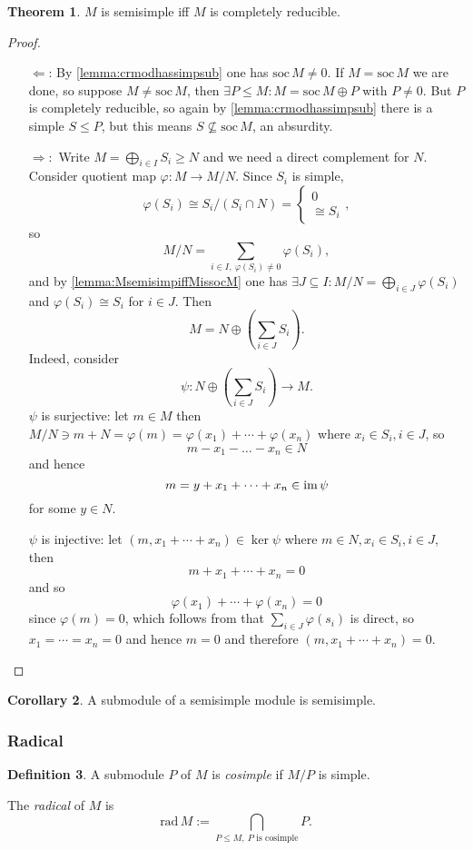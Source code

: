 \documentclass[a4paper]{article}
\newcommand{\rad}{\text{rad}\,}
\newcommand{\soc}{\text{soc}\,}
\newcommand{\im}{\text{im\,}}
\theoremstyle{definition}
\newtheorem{defn}{Definition}[subsection]
\newtheorem{thm}[defn]{Theorem}
\newtheorem{coro}[defn]{Corollary}
\begin{document}
\begin{thm}
\label{thm:semisimpequivcompred}
$M$ is semisimple iff $M$ is completely reducible.
\end{thm}
\begin{proof}
\begin{enumerate}
\item[$\Leftarrow$:] By \ref{lemma:crmodhassimpsub} one has $\soc M\neq 0$. If $M=\soc M$ we are done, so suppose $M\neq\soc M$, then $\exists P\leq M:M=\soc M\oplus P$ with $P\neq 0$. But $P$ is completely reducible, so again by \ref{lemma:crmodhassimpsub} there is a simple $S\leq P$, but this means $S\not\subseteq\soc M$, an absurdity.
\item[$\Rightarrow:$] Write $M=\bigoplus_{i\in I}S_i\geq N$ and we need a direct complement for $N$. Consider quotient map $\varphi:M\rightarrow M/N$. Since $S_i$ is simple,
\[
\varphi(S_i)\cong S_i/(S_i\cap N)=\left\{\begin{aligned}
  0\\\cong S_i
\end{aligned} \right.,
\]
so
\[
M/N=\sum_{i\in I,\ \varphi(S_i)\neq 0}\varphi(S_i),
\]
and by \ref{lemma:MsemisimpiffMissocM} one has $\exists J\subseteq I:M/N=\bigoplus_{i\in J}\varphi(S_i)$ and $\varphi(S_i)\cong S_i$ for $i\in J$. Then
\[
M=N\oplus \left(\sum_{i\in J}S_i\right).
\]
Indeed, consider
\[
\psi:N\oplus \left(\sum_{i\in J}S_i\right)\rightarrow M.
\]
$\psi$ is surjective: let $m\in M$ then $M/N\ni m+N=\varphi(m)=\varphi(x_1)+\cdots+\varphi(x_n)$ where $x_i\in S_i,i\in J$, so
\[
m-x_1-\ldots-x_n\in N
\]
and hence
\[
m=y+x_1+\cdots+x_n\in\im\psi
\]
for some $y\in N$.

$\psi$ is injective: let $(m,x_1+\cdots+x_n)\in\ker\psi$ where $m\in N,x_i\in S_i,i\in J$, then
\[
m+x_1+\cdots+x_n=0
\]
and so
\[
\varphi(x_1)+\cdots+\varphi(x_n)=0
\]
since $\varphi(m)=0$, which follows from that $\sum_{i\in J}\varphi(s_i)$ is direct, so $x_1=\cdots=x_n=0$ and hence $m=0$ and therefore $(m,x_1+\cdots+x_n)=0$.
\end{enumerate}
\end{proof}

\begin{coro}
\label{coro:subofsemisimpissemisimp}
A submodule of a semisimple module is semisimple.
\end{coro}

\subsubsection{Radical}
\begin{defn}
A submodule $P$ of $M$ is \textit{cosimple} if $M/P$ is simple.

The \textit{radical} of $M$ is
\[
\rad M:=\bigcap_{P\leq M,\ P\text{ is cosimple}} P.
\]
\end{defn}
\end{document}
